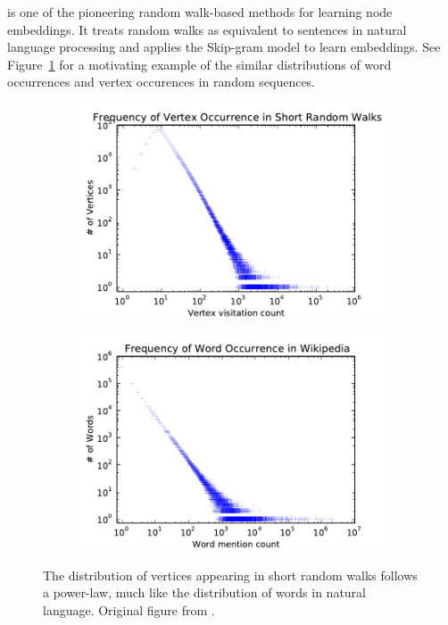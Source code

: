  is one of the pioneering random walk-based methods for learning node embeddings. It treats random walks as equivalent to sentences in natural language processing and applies the Skip-gram model to learn embeddings. See Figure~\ref{fig:deepwalk-motivation} for a motivating example of the similar distributions of word occurrences and vertex occurences in random sequences.

\begin{figure}
	\begin{subfigure}{0.49\linewidth}
		\includegraphics[width=\linewidth]{images/deepwalk-motivation/youtube-powerlaw.pdf}
	\end{subfigure}
	\begin{subfigure}{0.49\linewidth}
		\includegraphics[width=\linewidth]{images/deepwalk-motivation/wiki-powerlaw.pdf}
	\end{subfigure}
	\caption{The distribution of vertices appearing in short random walks follows a power-law, much like the distribution of words in natural language. Original figure from \cite{perozzi_deepwalk_2014}.}
	\label{fig:deepwalk-motivation}
\end{figure}

